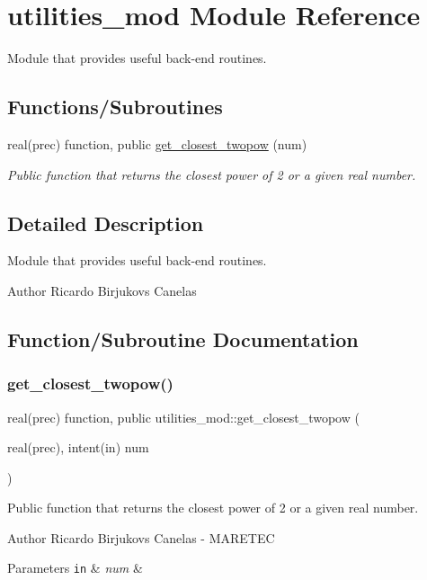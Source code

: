 \hypertarget{namespaceutilities__mod}{}\section{utilities\+\_\+mod Module Reference}
\label{namespaceutilities__mod}


Module that provides useful back-\/end routines.  


\subsection*{Functions/\+Subroutines}
\begin{DoxyCompactItemize}
\item 
real(prec) function, public \hyperlink{namespaceutilities__mod_a683f93677348e11d331c1c37c66caf7a}{get\+\_\+closest\+\_\+twopow} (num)
\begin{DoxyCompactList}\small\item\em Public function that returns the closest power of 2 or a given real number. \end{DoxyCompactList}\end{DoxyCompactItemize}


\subsection{Detailed Description}
Module that provides useful back-\/end routines. 

\begin{DoxyAuthor}{Author}
Ricardo Birjukovs Canelas 
\end{DoxyAuthor}


\subsection{Function/\+Subroutine Documentation}
\mbox{\label{namespaceutilities__mod_a683f93677348e11d331c1c37c66caf7a}} 
\subsubsection{\texorpdfstring{get\+\_\+closest\+\_\+twopow()}{get\_closest\_twopow()}}
{\footnotesize\ttfamily real(prec) function, public utilities\+\_\+mod\+::get\+\_\+closest\+\_\+twopow (\begin{DoxyParamCaption}\item[{real(prec), intent(in)}]{num }\end{DoxyParamCaption})}



Public function that returns the closest power of 2 or a given real number. 

\begin{DoxyAuthor}{Author}
Ricardo Birjukovs Canelas -\/ M\+A\+R\+E\+T\+EC 
\end{DoxyAuthor}

\begin{DoxyParams}[1]{Parameters}
\mbox{\tt in}  & {\em num} & \\
\hline
\end{DoxyParams}
